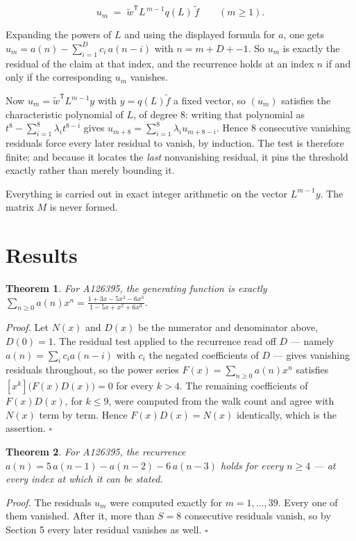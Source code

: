 \documentclass[11pt]{article}
\newtheorem{theorem}{Theorem}
\theoremstyle{definition}
\begin{document}
\[u_m \;=\; \tilde w^{\mathsf T} L^{\,m-1} q(L)\,\tilde f \qquad (m \ge 1).\]

Expanding the powers of $L$ and using the displayed formula for $a$, one gets $u_m = a(n) - \sum_{i=1}^{D} c_i\,a(n-i)$ with $n = m + D + -1$. So $u_m$ is exactly the residual of the claim at that index, and the recurrence holds at an index $n$ if and only if the corresponding $u_m$ vanishes.

Now $u_m = \tilde w^{\mathsf T} L^{m-1} y$ with $y = q(L)\tilde f$ a fixed vector, so $(u_m)$ satisfies the characteristic polynomial of $L$, of degree $8$: writing that polynomial as $t^{8} - \sum_{i=1}^{8} \lambda_i t^{8-i}$ gives $u_{m+8} = \sum_{i=1}^{8} \lambda_i u_{m+8-i}$. Hence $8$ consecutive vanishing residuals force every later residual to vanish, by induction. The test is therefore finite; and because it locates the {\itshape last} nonvanishing residual, it pins the threshold exactly rather than merely bounding it.

Everything is carried out in exact integer arithmetic on the vector $L^{m-1}y$. The matrix $M$ is never formed.

\section{Results}

\begin{theorem} For A126395, the generating function is exactly $\sum_{n\ge 0} a(n)x^n = \frac{1 + 3x - 5x^{2} - 6x^{3}}{1 - 5x + x^{2} + 6x^{3}}$.\end{theorem}

{\itshape Proof.} Let $N(x)$ and $D(x)$ be the numerator and denominator above, $D(0)=1$. The residual test applied to the recurrence read off $D$ --- namely $a(n) = \sum_i c_i a(n-i)$ with $c_i$ the negated coefficients of $D$ --- gives vanishing residuals throughout, so the power series $F(x)=\sum_{n\ge 0}a(n)x^n$ satisfies $[x^k]\bigl(F(x)D(x)\bigr) = 0$ for every $k > 4$. The remaining coefficients of $F(x)D(x)$, for $k \le 9$, were computed from the walk count and agree with $N(x)$ term by term. Hence $F(x)D(x) = N(x)$ identically, which is the assertion. $\square$

\begin{theorem} For A126395, the recurrence $a(n) = 5\,a(n-1) - a(n-2) - 6\,a(n-3)$ holds for every $n \ge 4$ --- at every index at which it can be stated.\end{theorem}

{\itshape Proof.} The residuals $u_m$ were computed exactly for $m = 1,\dots,39$. Every one of them vanished. After it, more than $S = 8$ consecutive residuals vanish, so by Section 5 every later residual vanishes as well. $\square$
\end{document}
